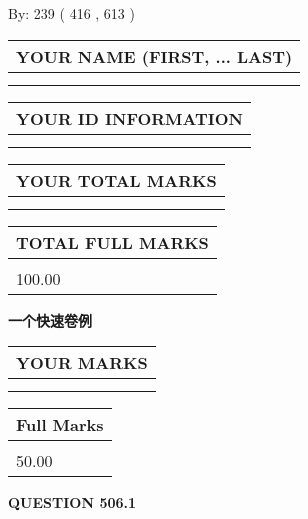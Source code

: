 \documentclass{ctexart}
\begin{document}
   
\hspace{1.0in} By: 
 239 ( 416 ,  613 )
   
   
   
   
\newpage 
\setcounter{page}{ 
   506001 } 
   
   
   
   
\noindent\begin{tabular}{|l|}
\hline
YOUR NAME (FIRST, ... LAST)  \\
\hline
 \\ 
 \\ 
\hline
\end{tabular}
\hspace{0.05in} \begin{tabular}{|l|}
\hline
 YOUR   ID   INFORMATION  \\
\hline
 \\ 
 \\ 
\hline
\end{tabular}
   
   
\vspace{0.2in}\noindent\begin{tabular}{|l|}
\hline
YOUR TOTAL MARKS  \\
\hline
 \\ 
 \\ 
\hline
\end{tabular}
\hspace{0.05in} \begin{tabular}{|l|}
\hline
TOTAL FULL MARKS  \\
\hline
 \\ 
100.00 \\
\hline
\end{tabular}
   
   
 \vspace{0.2in}
{\LARGE {\textbf{ 一个快速卷例}}}
   
   
  
\vspace{0.2in}
  
\noindent\begin{tabular}{|l|}
\hline
 YOUR MARKS  \\
\hline
 \\ 
 \\ 
\hline
\end{tabular}
\hspace{0.05in} \begin{tabular}{|l|}
\hline
 Full Marks  \\
\hline
 \\ 
50.00 \\
\hline
\end{tabular}
{\textbf{\Large{QUESTION
506.1 
}}}
  
\end{document}
